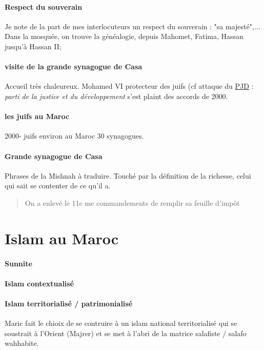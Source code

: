 \paragraph{Respect du souverain} Je note de la part de mes interlocuteurs un respect du souverain : "sa majesté",...
Dans la mosquée, on trouve la généalogie, depuis Mahomet, Fatima, Hassan jusqu'à Hassan II;

\paragraph{visite de la grande synagogue de Casa} Accueil très chaleureux. Mohamed VI protecteur des juifs (cf attaque du \href{https://fr.wikipedia.org/wiki/Parti_de_la_justice_et_du_d%C3%A9veloppement_(Maroc)}{PJD}
  : \textit{parti de la justice et du développement }s’est plaint des accords de 2000. 
\paragraph{les juifs au Maroc}  
2000-  juifs environ au Maroc
30 synagogues. 

\paragraph{Grande synagogue de Casa}
Phrases de la Mishnah à traduire. Touché par la définition de la richesse, celui qui sait se contenter de ce qu'il a.

\begin{quote}
    On a enlevé le 11e me commandements de remplir sa feuille d’impôt
\end{quote}

\section{Islam au Maroc}

\paragraph{Sunnite}

\paragraph{Islam contextualisé}

\paragraph{Islam territorialisé / patrimonialisé} Maric fait le chioix de se contruire à un islam national territorialisé qui se soustrait à l'Orient (Majrer) et se met à l'abri de la matrice salafiste / salafo wahhabite.


